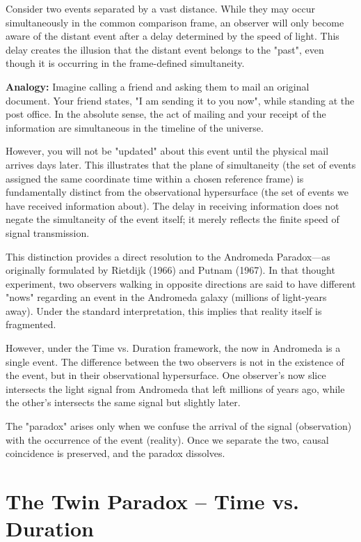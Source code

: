 \documentclass[pdflatex,sn-basic]{sn-jnl}
\theoremstyle{thmstyleone}%
\theoremstyle{thmstyletwo}%
\theoremstyle{thmstylethree}%
\begin{document}
	Consider two events separated by a vast distance. While they may occur simultaneously in the common comparison frame, an observer will only become aware of the distant event after a delay determined by the speed of light. This delay creates the illusion that the distant event belongs to the "past", even though it is occurring in the frame-defined simultaneity.

		\textbf{Analogy:} Imagine calling a friend and asking them to mail an original document. Your friend states, "I am sending it to you now", while standing at the post office. In the absolute sense, the act of mailing and your receipt of the information are simultaneous in the timeline of the universe. 

However, you will not be "updated" about this event until the physical mail arrives days later.
	This illustrates that the plane of simultaneity (the set of events assigned the same coordinate time within a chosen reference frame) is fundamentally distinct from the observational hypersurface (the set of events we have received information about). The delay in receiving information does not negate the simultaneity of the event itself; it merely reflects the finite speed of signal transmission.

	This distinction provides a direct resolution to the Andromeda Paradox—as originally formulated by Rietdijk (1966) and Putnam (1967). In that thought experiment, two observers walking in opposite directions are said to have different "nows" regarding an event in the Andromeda galaxy (millions of light-years away). Under the standard interpretation, this implies that reality itself is fragmented.

However, under the Time vs. Duration framework, the now in Andromeda is a single event. The difference between the two observers is not in the existence of the event, but in their observational hypersurface. One observer's now slice intersects the light signal from Andromeda that left millions of years ago, while the other's intersects the same signal but slightly later.

	The "paradox" arises only when we confuse the arrival of the signal (observation) with the occurrence of the event (reality). Once we separate the two, causal coincidence is preserved, and the paradox dissolves.

\section{The Twin Paradox – Time vs. Duration}\label{sec3}
\end{document}
